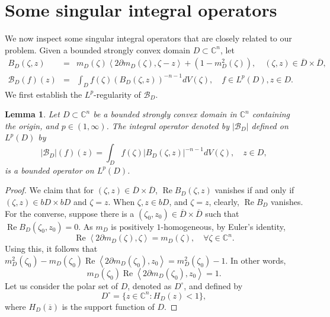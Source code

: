 \documentclass[11pt, oneside, reqno]{amsart}
\numberwithin{equation}{section}
\newtheorem{lemma}[theorem]{Lemma}
\theoremstyle{definition}
\newcommand{\be} {\begin{equation}}
\newcommand{\ee} {\end{equation}}
\newcommand{\bea} {\begin{eqnarray}}
\newcommand{\eea} {\end{eqnarray}}
\newcommand{\C}{\mathbb C}
\newcommand{\Cn}{{\mathbb{C}^n}}
\newcommand{\rea}{\operatorname{Re}}
\newcommand{\ltt}{\left(}
\newcommand{\rtt}{\right)}
\begin{document}
{    \section{Some singular integral operators}\label{S:SIOs}
We now inspect some singular integral operators that are closely related to our problem. Given a bounded strongly convex domain $D\subset\Cn$, let 
        \bea
    B_D\ltt\zeta,z\rtt&=& m_D(\zeta)\left\langle 2\partial m_D(\zeta),\zeta-z\right\rangle+\ltt1-m_D^2(\zeta)\rtt,\quad \ltt\zeta,z\rtt\in\overline{D}\times\overline{D}, \label{eq:def of LS ker}\\
     \mathcal B_D(f)(z)&=&\int_{D} f(\zeta) \left(B_D\ltt\zeta,z\rtt\right)^{-n-1} dV(\zeta),\quad f\in L^p(D), z\in D.\label{eq:def of LS SIO}
        \eea  
We first establish the $L^p$-regularity of $\mathcal B_D$. 
 \begin{lemma}\label{le:bdd of LS ker}
Let $D\subset\C^n$ be a bounded strongly convex domain in $\C^n$ containing the origin, and $p\in(1,\infty)$.
   The integral operator denoted by $\left|\mathcal B_D\right|$ defined on $L^p\ltt D\rtt$ by
   \[
    \left|\mathcal B_D\right|(f)(z)=\int_{D} f(\zeta) \left|B_D\ltt\zeta,z\rtt\right|^{-n-1} dV(\zeta),\quad z\in D,
    \]
   is a bounded operator on $L^p\ltt D\rtt$.
\end{lemma}
\begin{proof} 
We claim that for $(\zeta,z)\in\overline D\times\overline D$, $\rea{B_D}(\zeta,z)$ vanishes if and only if  $\ltt\zeta,z\rtt\in bD\times bD$ and $\zeta=z$. 
When $\zeta,z\in bD$, and $\zeta=z$, clearly, $\rea B_D$ vanishes. For the converse, suppose there is a $(\zeta_0, z_0)\in\overline{D}\times\overline{D}$ such that $\rea B_D(\zeta_0, z_0)=0$. As $m_D$ is positively $1$-homogeneous, by Euler's identity, 
\be\label{eq:euler}
\rea \left\langle2\partial m_D(\zeta),\zeta\right\rangle= m_D(\zeta),\quad\forall\zeta\in \C^n.
\ee
Using this, it follows that $m_D^2(\zeta_0)-m_D(\zeta_0)\rea\left\langle2\partial m_D(\zeta_0),z_0\right\rangle=m_D^2(\zeta_0)-1$. In other words,
\be\label{eq:constraint}
m_D(\zeta_0)\rea\left\langle2\partial m_D(\zeta_0),z_0\right\rangle=1.
\ee
Let us consider the polar set of $D$, denoted as $D^\circ$, and defined by
$$D^\circ=\{z\in\C^n:H_D(z)<1\},$$
where {$H_D(\overline z)$ is the support function of $D$.}

\end{proof}}
\end{document}
